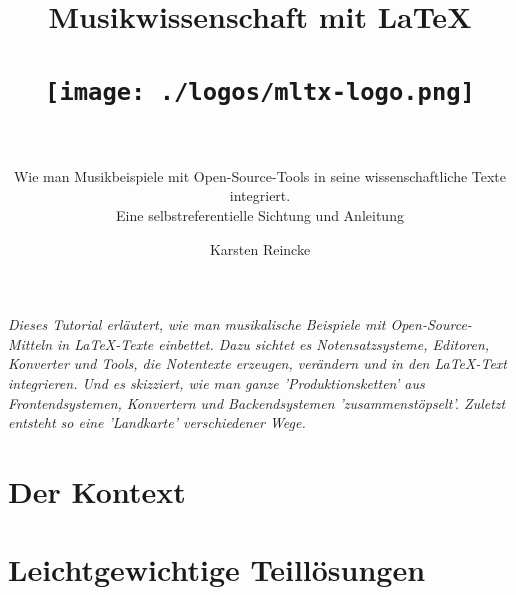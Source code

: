 \documentclass[
  DIV=calc,
  BCOR=5mm,
  12pt,
  headings=small,
  twoside,
  abstract=true,
  toc=bib,
  xcolor=dvipsnames,
  openany,
  english,ngerman]{scrbook}
\newcommand{\acc}[0]{\textit}
\begin{document}
\nocite{*}

\titlehead{\acc{mycrsf} basierte Geisteswissenschaft}
\subject{Leicht aktualisierte Version }
\title{Musikwissenschaft mit \LaTeX \\
  ~\\
  \texttt{[image: ./logos/mltx-logo.png]}\\
  ~\\
}
\subtitle{Wie man Musikbeispiele mit Open-Source-Tools in seine wissenschaftliche Texte integriert.\\ {\small Eine selbstreferentielle Sichtung und Anleitung}}
\author{Karsten Reincke}


\maketitle

\textit{Dieses Tutorial erläutert, wie man musikalische Beispiele mit Open-Source-Mitteln in \LaTeX-Texte einbettet. Dazu sichtet es Notensatzsysteme, Editoren, Konverter und Tools, die Notentexte erzeugen, verändern und in den \LaTeX-Text integrieren. Und es skizziert, wie man ganze 'Produktionsketten' aus Frontendsystemen, Konvertern und Backendsystemen 'zusammenstöpselt'. Zuletzt entsteht so eine 'Landkarte' verschiedener Wege.}

%




\footnotesize
\tableofcontents

\normalsize
\setcounter{chapter}{-1}
\chapter{Der Kontext}





\chapter{Leichtgewichtige Teillösungen}
\end{document}
